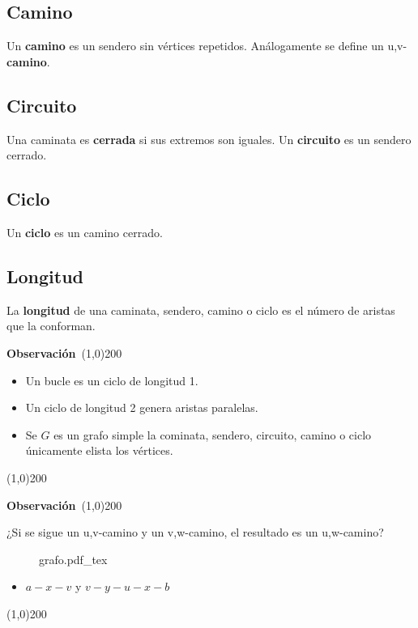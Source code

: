 \documentclass[a4paper]{book}
\newcommand{\incfig}[2][1]{%
    \def\svgwidth{#1\columnwidth}
    {#2.pdf_tex}
}
\newenvironment{obs}
    {
        \begin{flushleft}
       \textbf{Observación}\
        \line(1,0){200} \
        \end{flushleft}
    }
    {
        \begin{flushright}
        \line(1,0){200}
        \end{flushright}
    }
\begin{document}
\subsection{Camino}
\label{ssec:camino}

Un \textbf{camino} es un sendero sin vértices repetidos. Análogamente se define
un u,v-\textbf{camino}.

\subsection{Circuito}
\label{ssec:circuito}

Una caminata es \textbf{cerrada} si sus extremos son iguales. Un \textbf{circuito} es un sendero cerrado.

\subsection{Ciclo}
\label{ssec:ciclo}

Un \textbf{ciclo} es un camino cerrado.

\subsection{Longitud}
\label{ssec:longitud}

La \textbf{longitud} de una caminata, sendero, camino o ciclo es el número de aristas
que la conforman.

\begin{obs}
    \begin{itemize}
        \item Un bucle es un ciclo de longitud 1.
        \item Un ciclo de longitud 2 genera aristas paralelas.
        \item Se \(G\) es un grafo simple la cominata, sendero, circuito,
            camino o ciclo únicamente elista los vértices.
    \end{itemize}
\end{obs}

\begin{obs}
    ¿Si se sigue un u,v-camino y un v,w-camino, el resultado es un u,w-camino?
\begin{figure}[ht]
    \centering
    \incfig[0.5]{grafo}
\end{figure}
\begin{itemize}
    \item \(a-x-v\) y \(v-y-u-x-b\)
\end{itemize}
\end{obs}
\end{document}
